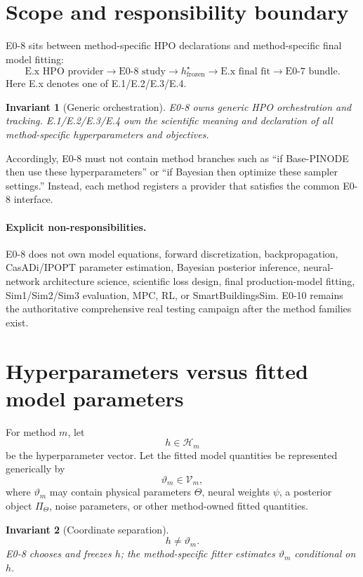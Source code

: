 \documentclass[11pt]{article}
\newcommand{\Hspace}{\mathcal{H}}
\newtheorem{invariant}{Invariant}
\begin{document}
\section{Scope and responsibility boundary}

E0-8 sits between method-specific HPO declarations and method-specific final
model fitting:
\[
\boxed{
\text{E.x HPO provider}
\rightarrow
\text{E0-8 study}
\rightarrow
h^{\star}_{\mathrm{frozen}}
\rightarrow
\text{E.x final fit}
\rightarrow
\text{E0-7 bundle}.
}
\]
Here E.x denotes one of E.1/E.2/E.3/E.4.

\begin{invariant}[Generic orchestration]
E0-8 owns generic HPO orchestration and tracking. E.1/E.2/E.3/E.4 own the
scientific meaning and declaration of all method-specific hyperparameters and
objectives.
\end{invariant}

Accordingly, E0-8 must not contain method branches such as ``if Base-PINODE then
use these hyperparameters'' or ``if Bayesian then optimize these sampler
settings.'' Instead, each method registers a provider that satisfies the common
E0-8 interface.

\paragraph{Explicit non-responsibilities.}
E0-8 does not own model equations, forward discretization, backpropagation,
CasADi/IPOPT parameter estimation, Bayesian posterior inference, neural-network
architecture science, scientific loss design, final production-model fitting,
Sim1/Sim2/Sim3 evaluation, MPC, RL, or SmartBuildingsSim. E0-10 remains the
authoritative comprehensive real testing campaign after the method families
exist.

\section{Hyperparameters versus fitted model parameters}

For method $m$, let
\[
h\in\Hspace_m
\]
be the hyperparameter vector. Let the fitted model quantities be represented
generically by
\[
\vartheta_m\in\mathcal V_m,
\]
where $\vartheta_m$ may contain physical parameters $\Theta$, neural weights
$\psi$, a posterior object $\Pi_\Theta$, noise parameters, or other
method-owned fitted quantities.

\begin{invariant}[Coordinate separation]
\[
\boxed{h\neq\vartheta_m.}
\]
E0-8 chooses and freezes $h$; the method-specific fitter estimates
$\vartheta_m$ conditional on $h$.
\end{invariant}
\end{document}
